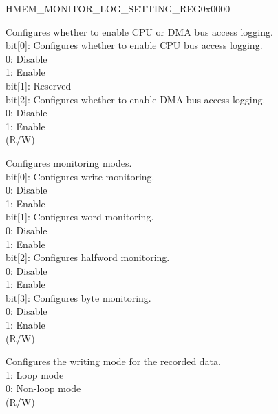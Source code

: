 \begin{register}{H}{MEM\_MONITOR\_LOG\_SETTING\_REG}{0x0000}\label{regdesc:MEMMONITORLOGSETTINGREG}
%
%
%
%
\regnewline%
\begin{regdesc}\begin{reglist}
\label{fielddesc:MEMMONITORLOGENA}\item [MEM\_MONITOR\_LOG\_ENA] Configures whether to enable  CPU or DMA bus access logging.\\
bit[0]: Configures whether to enable CPU bus access logging. \\
0: Disable \\
1: Enable\\
bit[1]: Reserved \\
bit[2]: Configures whether to enable DMA bus access logging. \\
0: Disable\\
1: Enable\\
(R/W)
\label{fielddesc:MEMMONITORLOGMODE}\item [MEM\_MONITOR\_LOG\_MODE]  Configures monitoring modes.\\
bit[0]: Configures write monitoring. \\
0: Disable \\
1: Enable\\
bit[1]: Configures word monitoring. \\
0: Disable \\
1: Enable\\
bit[2]: Configures halfword monitoring. \\
0: Disable \\
1: Enable\\
bit[3]: Configures byte monitoring. \\
0: Disable \\
1: Enable\\
(R/W)
\label{fielddesc:MEMMONITORLOGMEMLOOPENABLE}\item [MEM\_MONITOR\_LOG\_MEM\_LOOP\_ENABLE] Configures the writing mode for the recorded data. \\
1: Loop mode\\
0: Non-loop mode\\
(R/W)
\end{reglist}\end{regdesc}
\end{register}


